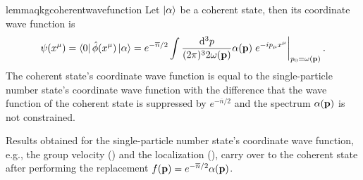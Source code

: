 \begin{restatable}{lemma}{qkgcoherentwavefunction}\label{thm:coherent_state_wave_function}
	Let $\ket{\alpha}$ be a coherent state, then its coordinate wave function is
	\begin{equation}
		\psi(x^\mu)
		=
		\bra{0}
		\hat\phi(x^\mu)
		\ket{\alpha}
		=
		e^{-\overline{n}/2}
		\int\frac{\dd[3]{p}}{(2\pi)^32\omega(\vb{p})}
		\alpha(\vb{p})
		\eval{e^{-ip_\mu x^\mu}}_{p_0=\omega(\vb{p})}
		.
	\end{equation}
	The coherent state's coordinate wave function is equal to the single-particle number state's coordinate wave function with the difference that the wave function of the coherent state is suppressed by $e^{-\overline{n}/2}$ and the spectrum $\alpha(\vb{p})$ is not constrained.
\end{restatable}
\begin{corollary}
	Results obtained for the single-particle number state's coordinate wave function, e.g., the group velocity () and the localization (), carry over to the coherent state after performing the replacement $f(\vb{p})=e^{-\overline{n}/2}\alpha(\vb{p})$.
\end{corollary}

